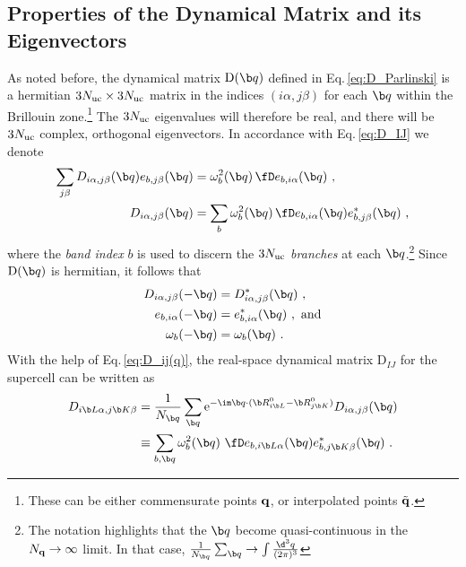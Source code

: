 \subsection{Properties of the Dynamical Matrix and its Eigenvectors}
\label{sec:dynmat.periodic}
As noted before, the dynamical matrix ${\rm D} (\b q)$ defined in Eq.\,\eqref{eq:D_Parlinski} is a hermitian $3N_{\rm uc} \times 3N_{\rm uc}$ matrix in the indices $(i \alpha, j \beta)$ for each $\b q$ within the Brillouin zone.\footnote{These can be either commensurate points $\bf q$, or interpolated points $\tilde{\bf q}$.} The $3N_{\rm uc}$ eigenvalues will therefore be real, and there will be $3N_{\rm uc}$ complex, orthogonal eigenvectors. In accordance with Eq.\,\eqref{eq:D_IJ} we denote
\begin{subequations}
\label{eq:D_ij(q)}
\begin{align}
	\sum_{j \beta} {D}_{i \alpha, j \beta} (\b q) e_{b, j \beta} (\b q)
		&= \omega^2_b (\b q) \, \fD e_{b, i \alpha} (\b q)~,
	\label{eq:D_ij(q)w} \\
	{D}_{i \alpha, j \beta} (\b q)
		&= \sum_b \omega^2_b (\b q) \, \fD e_{b, i \alpha} (\b q) e^\ast_{b, j \beta} (\b q)~,
\end{align}
\end{subequations}
where the \emph{band index} $b$ is used to discern the $3N_{\rm uc}$ \emph{branches} at each $\b q$.\footnote{The notation highlights that the $\b q$ become quasi-continuous in the $N_{\bf q} \to \infty$ limit. In that case, $\frac{1}{N_{\b q}} \sum_{\b q} \to \int \frac{\d^3 q}{(2 \pi)^3}$} 
Since ${\rm D} (\b q)$ is hermitian, it follows that~\cite{Maradudin1968}
\begin{align}
	D_{i \alpha, j \beta} (- \b q) 
		& = D_{i \alpha, j \beta}^\ast (\b q)~, \\
	e_{b, i \alpha} (- \b q)
		&= e^\ast_{b, i \alpha} (\b q)~,\text{ and} \\
	\omega_b (- \b q)
		&= \omega_b (\b q)~.
\end{align}
With the help of Eq.\,\eqref{eq:D_ij(q)}, the real-space dynamical matrix $\mathrm D_{IJ}$ for the supercell can be written as
\begin{align}
	D_{i \b L \alpha, j \b K \beta}  
		& = \frac{1}{N_{\b q}} \sum_{\b q} {\rm e}^{- \im \b q \cdot (\b R_{i \b L}^0 - \b R_{j \b K}^0)} {D}_{i \alpha, j \beta} (\b q) \\
		& \equiv  \sum_{b, \b q} \omega_b^2 (\b q) ~ \fD e_{b, i \b L \alpha} (\b q) e^{\ast}_{b, j \b K \beta} (\b q)~.
	\label{eq:D_{iLa}}
\end{align}
